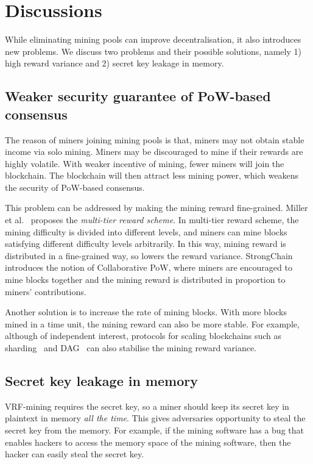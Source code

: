 \section{Discussions}
\label{sec:discussions}

While eliminating mining pools can improve decentralisation, it also introduces new problems.
We discuss two problems and their possible solutions, namely 1) high reward variance and 2) secret key leakage in memory.

\subsection{Weaker security guarantee of PoW-based consensus}

The reason of miners joining mining pools is that, miners may not obtain stable income via solo mining.
Miners may be discouraged to mine if their rewards are highly volatile.
With weaker incentive of mining, fewer miners will join the blockchain.
The blockchain will then attract less mining power, which weakens the security of PoW-based consensus.

This problem can be addressed by making the mining reward fine-grained.
Miller et al.~\cite{miller2015nonoutsourceable} proposes the \emph{multi-tier reward scheme}.
In multi-tier reward scheme, the mining difficulty is divided into different levels, and miners can mine blocks satisfying different difficulty levels arbitrarily.
In this way, mining reward is distributed in a fine-grained way, so lowers the reward variance.
StrongChain~\cite{szalachowski2019strongchain} introduces the notion of Collaborative PoW, where miners are encouraged to mine blocks together and the mining reward is distributed in proportion to miners' contributions.

Another solution is to increase the rate of mining blocks.
With more blocks mined in a time unit, the mining reward can also be more stable.
For example, although of independent interest, protocols for scaling blockchains such as sharding~\cite{wang2019monoxide} and DAG~\cite{li2018scaling} can also stabilise the mining reward variance.



\subsection{Secret key leakage in memory}

VRF-mining requires the secret key, so a miner should keep its secret key in plaintext in memory \emph{all the time}.
This gives adversaries opportunity to steal the secret key from the memory.
For example, if the mining software has a bug that enables hackers to access the memory space of the mining software, then the hacker can easily steal the secret key.

